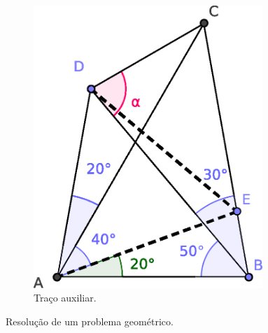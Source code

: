 \begin{itemize}
\begin{figure}[!h]
\begin{subfigure}[b]{0.45\textwidth}
         \includegraphics[width=0.95\textwidth]{chapters/cap-learning/prob-geometria2.eps} 
         \caption{Traço auxiliar.}
         \label{fig:geometria:b}
     \end{subfigure}
  \caption{Resolução de um problema geométrico.}
\label{fig:geometria}
\end{figure}


\end{itemize}
